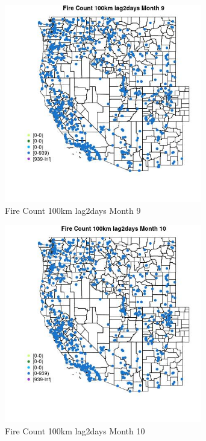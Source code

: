 \begin{figure} 
\centering  
\includegraphics[width=0.77\textwidth]{Code_Outputs/Report_ML_input_PM25_Step4_part_e_de_duplicated_aves_compiled_2019-05-21wNAs_MapObsMo9Fire_Count_100km_lag2days.jpg} 
\caption{\label{fig:Report_ML_input_PM25_Step4_part_e_de_duplicated_aves_compiled_2019-05-21wNAsMapObsMo9Fire_Count_100km_lag2days}Fire Count 100km lag2days Month 9} 
\end{figure} 
 

\begin{figure} 
\centering  
\includegraphics[width=0.77\textwidth]{Code_Outputs/Report_ML_input_PM25_Step4_part_e_de_duplicated_aves_compiled_2019-05-21wNAs_MapObsMo10Fire_Count_100km_lag2days.jpg} 
\caption{\label{fig:Report_ML_input_PM25_Step4_part_e_de_duplicated_aves_compiled_2019-05-21wNAsMapObsMo10Fire_Count_100km_lag2days}Fire Count 100km lag2days Month 10} 
\end{figure} 
 

